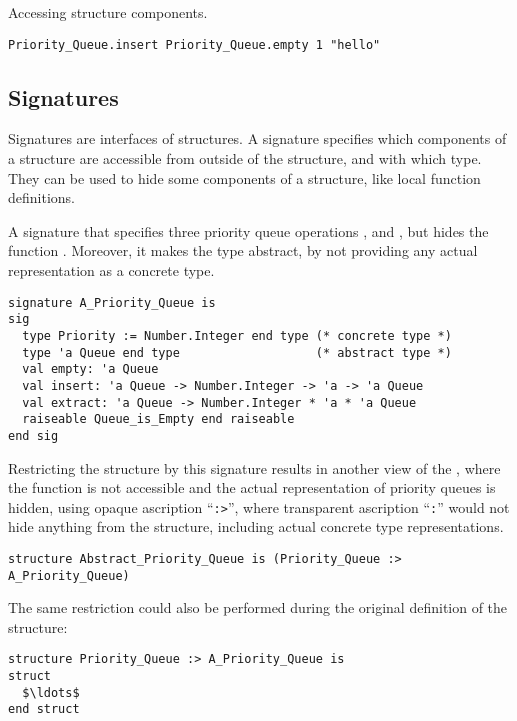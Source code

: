 \example Accessing structure components.
\begin{lstlisting}
Priority_Queue.insert Priority_Queue.empty 1 "hello"
\end{lstlisting}






\subsection{Signatures}

Signatures are interfaces of structures. A signature specifies which components of a structure are accessible from outside of the structure, and with which type. They can be used to hide some components of a structure, like local function definitions. 

\example A signature that specifies three priority queue operations ,  and , but hides the function . Moreover, it makes the  type abstract, by not providing any actual representation as a concrete type. 
\begin{lstlisting}
signature A_Priority_Queue is
sig
  type Priority := Number.Integer end type (* concrete type *)
  type 'a Queue end type                   (* abstract type *)
  val empty: 'a Queue
  val insert: 'a Queue -> Number.Integer -> 'a -> 'a Queue
  val extract: 'a Queue -> Number.Integer * 'a * 'a Queue
  raiseable Queue_is_Empty end raiseable
end sig
\end{lstlisting}
Restricting the  structure by this signature results in another view of the , where the  function is not accessible and the actual representation of priority queues is hidden, using opaque ascription ``\lstinline!:>!'', where transparent ascription ``\lstinline!:!'' would not hide anything from the structure, including actual concrete type representations. 
\begin{lstlisting}
structure Abstract_Priority_Queue is (Priority_Queue :> A_Priority_Queue)
\end{lstlisting}
The same restriction could also be performed during the original definition of the structure:
\begin{lstlisting}
structure Priority_Queue :> A_Priority_Queue is
struct 
  $\ldots$
end struct
\end{lstlisting}





